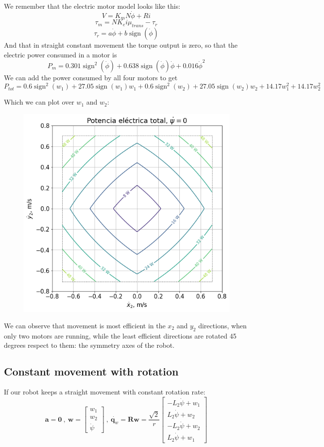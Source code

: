 \documentclass[12pt]{article}
\renewcommand{\vec}[1]{\bm{#1}}
\newcommand{\R}{\mathbb R}
\newcommand{\w}{\dot\varphi}
\def\R{\vec R}
\def\q{\vec q}
\begin{document}
We remember that the electric motor model looks like this:
$$ V = K_m N\dot{\phi} + Ri$$
$$ \tau_m = N K_ei\mu_{trans} - \tau_r$$
$$ \tau_r = a \dot{\phi} + b\operatorname{sign}(\dot{\phi}) $$
And that in straight constant movement the torque output is zero, so that the electric power consumed in a motor is 
$$ P_m = 0.301 \operatorname{sign}^{2}\left(\dot{\phi}\right) + 0.638 \operatorname{sign}\left(\dot{\phi}\right) \dot{\phi} + 0.016 \dot{\phi}^{2}$$
We can add the power consumed by all four motors to get 
$$P_{tot} = 0.6 \operatorname{sign}^{2}\left(w_1\right) + 27.05 \operatorname{sign}\left(w_1\right) w_1 + 0.6 \operatorname{sign}^{2}\left(w_2\right) + 27.05 \operatorname{sign}\left(w_2\right) w_2 + 14.17 w_1^{2} + 14.17 w_2^{2}$$

Which we can plot over $w_1$ and $w_2$: 
\begin{figure}[h]
	\centering
	\includegraphics[width=.5\linewidth]{power_map_base_2}
	\label{fig:power_ct_speed}
\end{figure}

We can observe that movement is most efficient in the $x_2$ and $y_2$ directions, when only two motors are running, while the least efficient directions are rotated 45 degrees respect to them: the symmetry axes of the robot.
\subsection*{Constant movement with rotation}
If our robot keeps a straight movement with constant rotation rate:
$$ \vec{a} = \vec{0}\ ,\ \vec{w} = \left[\begin{matrix}w_1\\w_2\\\dot{\psi}\end{matrix}\right]\ ,\ \dot{\q_w} = \R \vec{w} = \frac{\sqrt{2}}{r} \left[\begin{matrix}- L_{2} \dot{\psi} + w_1\\L_{2} \dot{\psi} + w_2\\- L_{2} \dot{\psi} + w_2\\L_{2} \dot{\psi} + w_1\end{matrix}\right]$$
\end{document}
